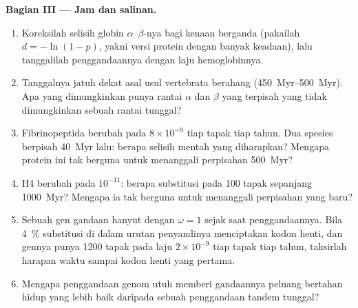 \begin{problem}
\medskip
\noindent\textbf{Bagian III --- Jam dan salinan.}
\begin{enumerate}[resume]
  \item Koreksilah selisih globin $\alpha$--$\beta$-nya bagi kenaan
        berganda (pakailah $d = -\ln(1 - p)$, yakni versi protein dengan banyak
        keadaan), lalu tanggalilah penggandaannya dengan laju hemoglobinnya.
  \item Tanggalnya jatuh dekat asal usul vertebrata berahang
        (\qtyrange{450}{500}{Myr}). Apa yang dimungkinkan punya rantai $\alpha$
        dan $\beta$ yang terpisah yang tidak dimungkinkan sebuah rantai tunggal?
  \item Fibrinopeptida berubah pada $8\times 10^{-9}$ tiap tapak tiap tahun.
        Dua spesies berpisah \qty{40}{Myr} lalu: berapa selisih mentah yang diharapkan?
        Mengapa protein ini tak berguna untuk menanggali perpisahan
        \qty{500}{Myr}?
  \item {} H4 berubah pada $10^{-11}$: berapa substitusi pada 100
        tapak sepanjang \qty{1000}{Myr}? Mengapa ia tak berguna untuk menanggali perpisahan
        yang baru?
  \item Sebuah gen gandaan hanyut dengan $\omega = 1$ sejak saat
        penggandaannya. Bila \qty{4}{\%} substitusi di dalam urutan penyandinya
        menciptakan kodon henti, dan gennya punya 1200 tapak pada laju $2\times
        10^{-9}$ tiap tapak tiap tahun, taksirlah harapan waktu sampai
        kodon henti yang pertama.
  \item Mengapa penggandaan genom utuh memberi gandaannya peluang
        bertahan hidup yang lebih baik daripada sebuah penggandaan tandem tunggal?
\end{enumerate}


\end{problem}
